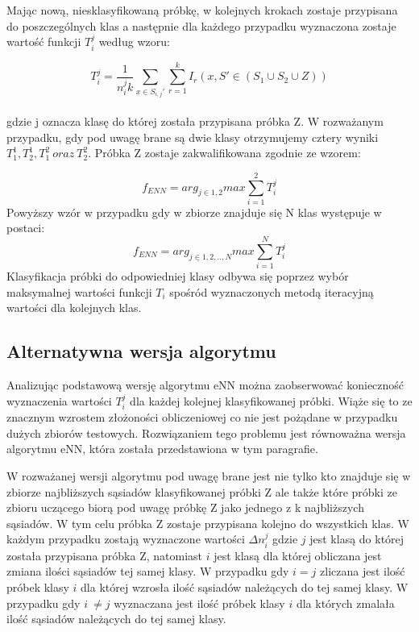 Mając nową, niesklasyfikowaną próbkę, w kolejnych krokach zostaje przypisana do poszczególnych klas a następnie dla każdego przypadku wyznaczona zostaje wartość funkcji $T_i^j$ według wzoru:

\begin{equation}
T_{i}^{j} = \frac{1}{n_i^j k} {\sum_{x \in S_{i,j}'} \sum_{r=1}^{k} I_r (x,S' \in (S_1 \cup S_2 \cup {Z}))} 
\end{equation}\\
gdzie j oznacza klasę do której została przypisana próbka Z.
W rozważanym przypadku, gdy pod uwagę brane są dwie klasy otrzymujemy cztery wyniki $T_1^1, T_2^1, T_1^2\ oraz\ T_2^2$. Próbka Z zostaje zakwalifikowana zgodnie ze wzorem:

\begin{equation}
f_{ENN} = arg_{j\in1,2} max \sum_{i=1}^{2} T_i^j
\end{equation}
Powyższy wzór w przypadku gdy w zbiorze znajduje się N klas występuje w postaci:
\begin{equation}
f_{ENN} = arg_{j\in1,2,..,N} max \sum_{i=1}^{N} T_i^j
\end{equation}
Klasyfikacja próbki do odpowiedniej klasy odbywa się poprzez wybór maksymalnej wartości funkcji $T_i$ spośród wyznaczonych metodą iteracyjną wartości dla kolejnych klas.

\subsection{Alternatywna wersja algorytmu}
Analizując podstawową wersję algorytmu eNN można zaobserwować konieczność wyznaczenia wartości $T_i^j$ dla każdej kolejnej klasyfikowanej próbki. Wiąże się to  ze znacznym wzrostem złożoności obliczeniowej co nie jest pożądane w przypadku dużych zbiorów testowych. Rozwiązaniem tego problemu jest równoważna wersja algorytmu eNN, która została przedstawiona w tym paragrafie. 

W rozważanej wersji algorytmu pod uwagę brane jest nie tylko kto znajduje się w zbiorze najbliższych sąsiadów klasyfikowanej próbki Z ale także które próbki ze zbioru uczącego biorą pod uwagę próbkę Z jako jednego z k najbliższych sąsiadów. W tym celu próbka Z zostaje przypisana kolejno do wszystkich klas. W każdym przypadku zostają wyznaczone wartości $\Delta n_i^j$ gdzie $j$ jest klasą do której została przypisana próbka Z, natomiast $i$ jest klasą dla której obliczana jest zmiana ilości sąsiadów tej samej klasy. W przypadku gdy $i = j$ zliczana jest ilość próbek klasy $i$ dla której wzrosła ilość sąsiadów należących do tej samej klasy. W przypadku gdy $i\ \neq j$ wyznaczana jest ilość próbek klasy $i$ dla których zmalała ilość sąsiadów należących do tej samej klasy.

